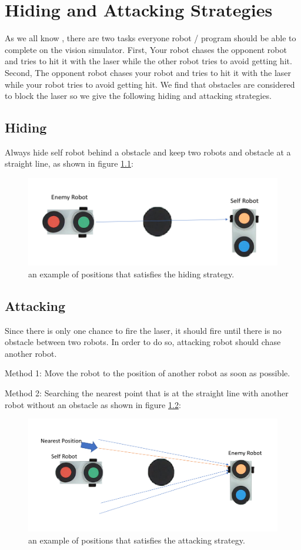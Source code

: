 \chapter{Hiding and Attacking Strategies}
\label{cha:STRATEGIES}

As we all know , there are two tasks everyone robot / program should be able to complete on the vision simulator. First, Your robot chases the opponent robot and tries to hit it with the laser while the other robot tries to avoid getting hit. Second, The opponent robot chases your robot and tries to hit it with the laser while your robot tries to avoid getting hit. We find that obstacles are considered to block the laser so we give the following hiding and attacking strategies. 

\section{Hiding}
Always hide self robot behind a obstacle and keep two robots and obstacle at a straight line, as shown in figure \ref{hiding_strategy}:

\begin{figure}[thb]
    \centering
    \includegraphics[width=1\textwidth]{images/hiding_strategy.png}
    \caption[hiding strategy]{an example of positions that satisfies the hiding strategy.}\label{hiding_strategy}
\end{figure}

\section{Attacking}
Since there is only one chance to fire the laser, it should fire until there is no obstacle between two robots. In order to do so, attacking robot should chase another robot. 

Method 1:
Move the robot to the position of another robot as soon as possible.

Method 2:
Searching the nearest point that is at the straight line with another robot without an obstacle as shown in figure \ref{attacking_method2}:

\begin{figure}[thb]
    \centering
    \includegraphics[width=1\textwidth]{images/attacking_method2.png}
    \caption[attacking method]{an example of positions that satisfies the attacking strategy.}\label{attacking_method2}
\end{figure}
